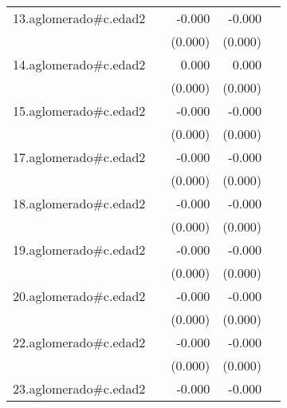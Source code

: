 {\begin{longtable}{l*{4}{D{.}{.}{-1}}}
\addlinespace
13.aglomerado#c.edad2&                     &      -0.000         &      -0.000\sym{***}&                     \\
            &                     &     (0.000)         &     (0.000)         &                     \\
\addlinespace
14.aglomerado#c.edad2&                     &       0.000         &       0.000         &                     \\
            &                     &     (0.000)         &     (0.000)         &                     \\
\addlinespace
15.aglomerado#c.edad2&                     &      -0.000         &      -0.000\sym{**} &                     \\
            &                     &     (0.000)         &     (0.000)         &                     \\
\addlinespace
17.aglomerado#c.edad2&                     &      -0.000         &      -0.000\sym{*}  &                     \\
            &                     &     (0.000)         &     (0.000)         &                     \\
\addlinespace
18.aglomerado#c.edad2&                     &      -0.000         &      -0.000         &                     \\
            &                     &     (0.000)         &     (0.000)         &                     \\
\addlinespace
19.aglomerado#c.edad2&                     &      -0.000         &      -0.000         &                     \\
            &                     &     (0.000)         &     (0.000)         &                     \\
\addlinespace
20.aglomerado#c.edad2&                     &      -0.000         &      -0.000         &                     \\
            &                     &     (0.000)         &     (0.000)         &                     \\
\addlinespace
22.aglomerado#c.edad2&                     &      -0.000         &      -0.000         &                     \\
            &                     &     (0.000)         &     (0.000)         &                     \\
\addlinespace
23.aglomerado#c.edad2&                     &      -0.000         &      -0.000\sym{**} &                     \\

\end{longtable}}
